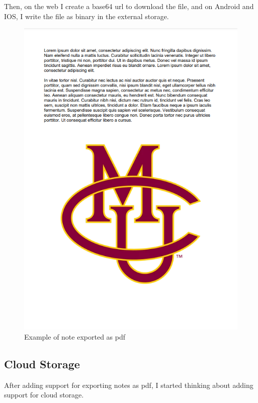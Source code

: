 \documentclass[]{article}
\begin{document}
	Then, on the web I create a base64 url to download the file, and on Android and IOS, I write the file as binary in the external storage.
	
	\begin{figure}[!htb]
		\centering
		\includegraphics[scale=0.4]{pdf_export}
		\caption{Example of note exported as pdf}
	\end{figure}
	
	\pagebreak
	
	\subsection{Cloud Storage}
	
	After adding support for exporting notes as pdf, I started thinking about adding support for cloud storage.\linebreak
	
\end{document}
